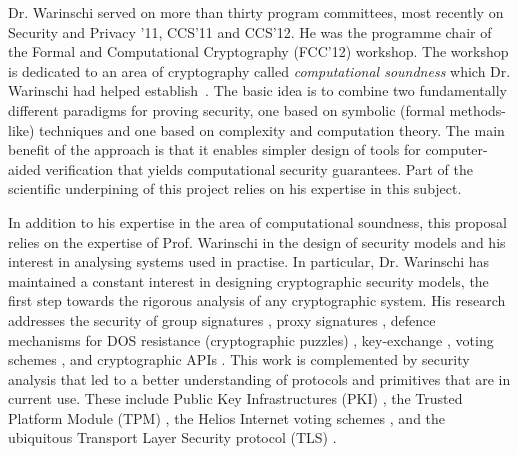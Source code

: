 \documentclass[10pt]{article}
\begin{document}
\iffalse
He was a co-investigator on the EP/H043454/1 EPSRC grant on "Privacy and Attestation Technologies" and on the ERC Advanced Grant ERC-2010-AdG-267188-CRIPTO on "Cryptography Research Involving Practical and Theoretical Outlooks". 
He is a co-PI on the FP 7 project ``PRACTICE" (grant agreement 609611).
\fi
Dr. Warinschi served on more than thirty program committees, most recently on Security and Privacy '11, CCS'11 and CCS'12. 
He was the programme chair of the Formal and Computational Cryptography (FCC'12) workshop. 
The workshop is dedicated to an area of cryptography called {\em computational   soundness} which Dr. Warinschi had helped establish~\cite{micciancio04completeness,micciancio04soundness,cortier05computationally,abadi05security,abadi05passwordbased,abadi06guessing,datta06computationally,cortier06computationally}.
The basic idea is to combine two fundamentally different paradigms for proving security, one based on symbolic (formal methods-like) techniques and one based on complexity and computation theory. The main benefit of the approach is that it enables simpler design of tools for computer-aided verification that yields computational security guarantees.
Part of the scientific underpining of this project relies on his expertise in this subject. 

In addition to his expertise in the area of computational soundness, this proposal relies on the expertise of Prof. Warinschi in the design of security models and his interest in analysing systems used in practise.
In particular, Dr. Warinschi has maintained a constant interest in designing cryptographic security models, the first step towards the rigorous analysis of any cryptographic system. 
His research addresses the security of group signatures \cite{BMW03}, proxy signatures \cite{proxies}, defence mechanisms for DOS resistance (cryptographic puzzles) \cite{puzzles},  key-exchange \cite{ke}, voting schemes \cite{helios}, and cryptographic APIs \cite{KSW11}.
This work is complemented by security analysis that led to a better understanding of protocols and primitives that are in current use.  These include Public Key Infrastructures (PKI) \cite{boldyreva07acloser}, the Trusted Platform Module (TPM) \cite{pcas}, the Helios Internet voting schemes \cite{helios}, and the ubiquitous Transport Layer Security protocol (TLS) \cite{tls}. 
\end{document}
